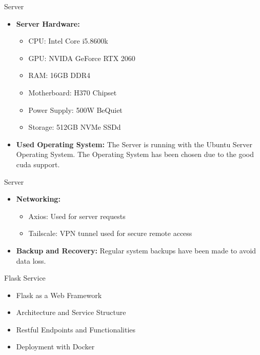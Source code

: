 \documentclass{beamer}
\begin{document}
\begin{frame}{Server}
  \begin{itemize}
    \item \textbf{Server Hardware:}
      \begin{itemize}
        \item CPU: Intel Core i5.8600k
        \item GPU: NVIDA GeForce RTX 2060
        \item RAM: 16GB DDR4 
        \item Motherboard: H370 Chipset
        \item Power Supply: 500W BeQuiet
        \item Storage: 512GB NVMe SSDd
      \end{itemize}
    \item \textbf{Used Operating System:} The Server is running with the Ubuntu Server Operating System. The Operating System has been chosen due to the good cuda support. 

  \end{itemize}
\end{frame}

\begin{frame}{Server}
  \begin{itemize}
    \item \textbf{Networking:}
      \begin{itemize}
        \item Axios: Used for server requests 
        \item Tailscale: VPN tunnel used for secure remote access 
      \end{itemize}
    \item \textbf{Backup and Recovery:} Regular system backups have been made to avoid data loss.      
  \end{itemize}
\end{frame}

\begin{frame}{Flask Service}
  \begin{itemize}
    \item Flask as a Web Framework
    \item Architecture and Service Structure
    \item Restful Endpoints and Functionalities
    \item Deployment with Docker
  \end{itemize}
\end{frame}
\end{document}
